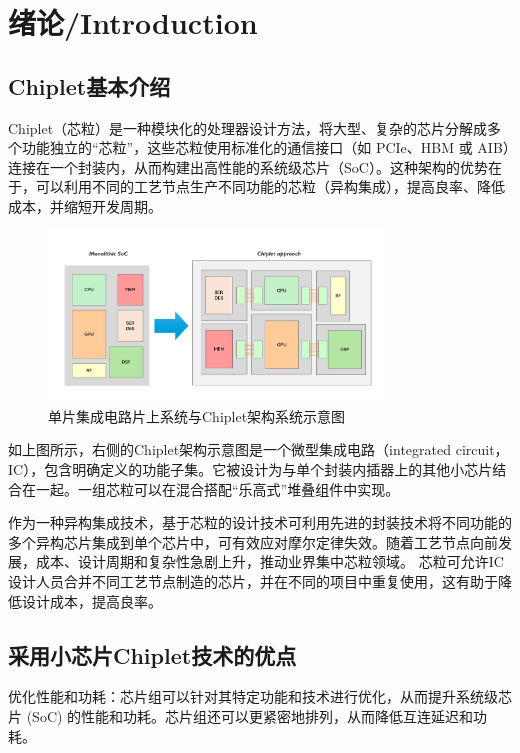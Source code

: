 
\section{绪论/Introduction}

\subsection{Chiplet基本介绍}

Chiplet（芯粒）是一种模块化的处理器设计方法，将大型、复杂的芯片分解成多个功能独立的“芯粒”，这些芯粒使用标准化的通信接口（如 PCIe、HBM 或 AIB）连接在一个封装内，从而构建出高性能的系统级芯片（SoC）。这种架构的优势在于，可以利用不同的工艺节点生产不同功能的芯粒（异构集成），提高良率、降低成本，并缩短开发周期。

\begin{figure}[htbp]
	\centering
	\includegraphics[width=0.8\textwidth]{img/1-1.png} %
	\caption{单片集成电路片上系统与Chiplet架构系统示意图 \cite{Beyne2024Chiplet}}
	\label{fig:example}
\end{figure}

如上图所示，右侧的Chiplet架构示意图是一个微型集成电路（integrated circuit，IC），包含明确定义的功能子集。它被设计为与单个封装内插器上的其他小芯片结合在一起。一组芯粒可以在混合搭配“乐高式”堆叠组件中实现。

作为一种异构集成技术，基于芯粒的设计技术可利用先进的封装技术将不同功能的多个异构芯片集成到单个芯片中，可有效应对摩尔定律失效。随着工艺节点向前发展，成本、设计周期和复杂性急剧上升，推动业界集中芯粒领域。 芯粒可允许IC设计人员合并不同工艺节点制造的芯片，并在不同的项目中重复使用，这有助于降低设计成本，提高良率。

\subsection{采用小芯片Chiplet技术的优点}

优化性能和功耗：芯片组可以针对其特定功能和技术进行优化，从而提升系统级芯片 (SoC) 的性能和功耗。芯片组还可以更紧密地排列，从而降低互连延迟和功耗。

